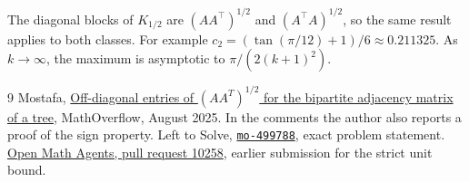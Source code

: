 \documentclass[11pt]{article}
\begin{document}
The diagonal blocks of $K_{1/2}$ are $(AA^\top)^{1/2}$ and $(A^\top A)^{1/2}$, so the same result applies to both classes. For example $c_2=(\tan(\pi/12)+1)/6\approx0.211325$. As $k\to\infty$, the maximum is asymptotic to $\pi/(2(k+1)^2)$.

\begin{thebibliography}{9}
 Mostafa, \href{https://mathoverflow.net/questions/499788}{Off-diagonal entries of $(AA^T)^{1/2}$ for the bipartite adjacency matrix of a tree}, MathOverflow, August 2025. In the comments the author also reports a proof of the sign property.
 Left to Solve, \href{https://lefttosolve.com/p/mo-499788}{\texttt{mo-499788}}, exact problem statement.
 \href{https://github.com/GuillaumeBAUD-coder/open-math-agents/pull/10258}{Open Math Agents, pull request 10258}, earlier submission for the strict unit bound.
\end{thebibliography}
\end{document}
